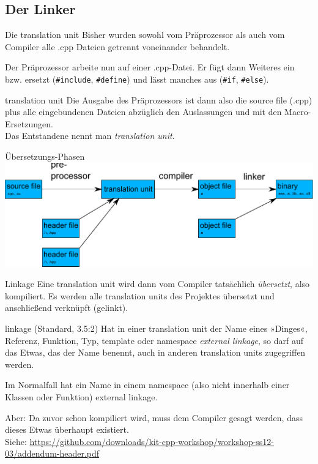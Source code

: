\subsection{Der Linker}

\begin{frame}[fragile]{Die translation unit}
	Bisher wurden sowohl vom Präprozessor als auch vom Compiler alle .cpp Dateien getrennt voneinander behandelt.
	
	Der Präprozessor arbeite nun auf einer .cpp-Datei. Er fügt dann Weiteres ein bzw. ersetzt (\verb|#include|, \verb|#define|) und lässt manches aus (\verb|#if|, \verb|#else|).
	
	\vspace{1em}
	
	\begin{block}{translation unit}
		Die Ausgabe des Präprozessors ist dann also die source file (.cpp) plus alle eingebundenen Dateien abzüglich den Auslassungen und mit den Macro-Ersetzungen.\\
		Das Entstandene nennt man \emph{translation unit}.
	\end{block}
\end{frame}

\begin{frame}[fragile]{Übersetzungs-Phasen}
	\includegraphics[width=\textwidth]{images/translation}
\end{frame}

\begin{frame}{Linkage}
	Eine translation unit wird dann vom Compiler tatsächlich \emph{übersetzt}, also kompiliert. Es werden alle translation units des Projektes übersetzt und anschließend verknüpft (gelinkt).
	
	\vspace{1em}
	
	\begin{block}{linkage (Standard, 3.5:2)}
		Hat in einer translation unit der Name eines »Dinges«, Referenz, Funktion, Typ, template oder namespace \emph{external linkage}, so darf auf das Etwas, das der Name benennt, auch in anderen translation units zugegriffen werden.
	\end{block}
	Im Normalfall hat ein Name in einem namespace (also nicht innerhalb einer Klassen oder Funktion) external linkage.
	
	\vspace{1em}
	\pause
	
	Aber: Da zuvor schon kompiliert wird, muss dem Compiler gesagt werden, dass dieses Etwas überhaupt existiert.\\
	\tiny
	Siehe: \url{https://github.com/downloads/kit-cpp-workshop/workshop-ss12-03/addendum-header.pdf}
\end{frame}

